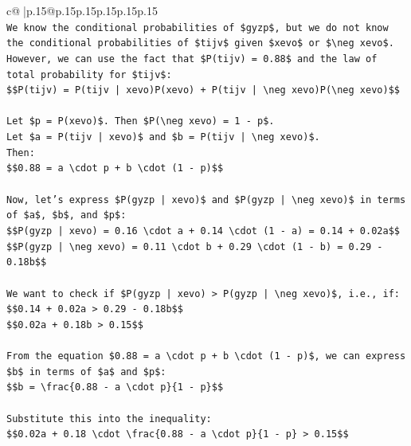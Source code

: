 \documentclass{article}
\begin{document}
{\begin{supertabular}{c@{$\;$}|p{.15\linewidth}@{}p{.15\linewidth}p{.15\linewidth}p{.15\linewidth}p{.15\linewidth}p{.15\linewidth}}
{{{\\ 
\texttt{We know the conditional probabilities of \$gyzp\$, but we do not know the conditional probabilities of \$tijv\$ given \$xevo\$ or \$\textbackslash{}neg xevo\$. However, we can use the fact that \$P(tijv) = 0.88\$ and the law of total probability for \$tijv\$:} \\
\texttt{\$\$P(tijv) = P(tijv | xevo)P(xevo) + P(tijv | \textbackslash{}neg xevo)P(\textbackslash{}neg xevo)\$\$} \\
\\ 
\texttt{Let \$p = P(xevo)\$. Then \$P(\textbackslash{}neg xevo) = 1 {-} p\$.} \\
\texttt{Let \$a = P(tijv | xevo)\$ and \$b = P(tijv | \textbackslash{}neg xevo)\$.} \\
\texttt{Then:} \\
\texttt{\$\$0.88 = a \textbackslash{}cdot p + b \textbackslash{}cdot (1 {-} p)\$\$} \\
\\ 
\texttt{Now, let's express \$P(gyzp | xevo)\$ and \$P(gyzp | \textbackslash{}neg xevo)\$ in terms of \$a\$, \$b\$, and \$p\$:} \\
\texttt{\$\$P(gyzp | xevo) = 0.16 \textbackslash{}cdot a + 0.14 \textbackslash{}cdot (1 {-} a) = 0.14 + 0.02a\$\$} \\
\texttt{\$\$P(gyzp | \textbackslash{}neg xevo) = 0.11 \textbackslash{}cdot b + 0.29 \textbackslash{}cdot (1 {-} b) = 0.29 {-} 0.18b\$\$} \\
\\ 
\texttt{We want to check if \$P(gyzp | xevo) > P(gyzp | \textbackslash{}neg xevo)\$, i.e., if:} \\
\texttt{\$\$0.14 + 0.02a > 0.29 {-} 0.18b\$\$} \\
\texttt{\$\$0.02a + 0.18b > 0.15\$\$} \\
\\ 
\texttt{From the equation \$0.88 = a \textbackslash{}cdot p + b \textbackslash{}cdot (1 {-} p)\$, we can express \$b\$ in terms of \$a\$ and \$p\$:} \\
\texttt{\$\$b = \textbackslash{}frac\{0.88 {-} a \textbackslash{}cdot p\}\{1 {-} p\}\$\$} \\
\\ 
\texttt{Substitute this into the inequality:} \\
\texttt{\$\$0.02a + 0.18 \textbackslash{}cdot \textbackslash{}frac\{0.88 {-} a \textbackslash{}cdot p\}\{1 {-} p\} > 0.15\$\$} \\
\\ 
}}}
\end{supertabular}}
\end{document}
